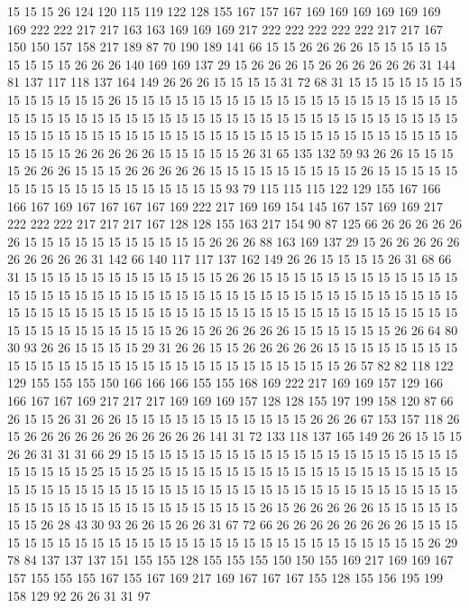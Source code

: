 15 15 15 26 124 120 115 119 122 128 155 167 157 167 169 169 169 169 169 169
169 222 222 217 217 163 163 169 169 169 217 222 222 222 222 222 217 217 167 150
150 157 158 217 189 87 70 190 189 141 66 15 15 26 26 26 26 15 15 15
15 15 15 15 15 15 26 26 26 140 169 169 137 29 15 26 26 26 15 26
26 26 26 26 26 31 144 81 137 117 118 137 164 149 26 26 26 15 15 15
15 31 72 68 31 15 15 15 15 15 15 15 15 15 15 15 15 15 26 15
15 15 15 15 15 15 15 15 15 15 15 15 15 15 15 15 15 15 15 15
15 15 15 15 15 15 15 15 15 15 15 15 15 15 15 15 15 15 15 15
15 15 15 15 15 15 15 15 15 15 15 15 15 15 15 15 15 15 15 15
15 15 15 15 15 15 15 15 15 15 15 15 15 15 15 15 15 26 26 26
26 26 15 15 15 15 15 26 31 65 135 132 59 93 26 26 15 15 15 15
26 26 26 15 15 15 26 26 26 26 26 15 15 15 15 15 15 15 15 15
26 15 15 15 15 15 15 15 15 15 15 15 15 15 15 15 15 15 15 93
79 115 115 115 122 129 155 167 166 166 167 169 167 167 167 167 169 222 217 169
169 154 145 167 157 169 169 217 222 222 222 217 217 217 167 128 128 155 163 217
154 90 87 125 66 26 26 26 26 26 26 15 15 15 15 15 15 15 15 15
15 15 26 26 26 88 163 169 137 29 15 26 26 26 26 26 26 26 26 26
26 31 142 66 140 117 117 137 162 149 26 26 15 15 15 15 26 31 68 66
31 15 15 15 15 15 15 15 15 15 15 15 15 26 26 15 15 15 15 15
15 15 15 15 15 15 15 15 15 15 15 15 15 15 15 15 15 15 15 15
15 15 15 15 15 15 15 15 15 15 15 15 15 15 15 15 15 15 15 15
15 15 15 15 15 15 15 15 15 15 15 15 15 15 15 15 15 15 15 15
15 15 15 15 15 15 15 15 15 15 15 26 15 26 26 26 26 26 15 15
15 15 15 15 26 26 64 80 30 93 26 26 15 15 15 15 29 31 26 26
15 15 26 26 26 26 26 15 15 15 15 15 15 15 15 15 15 15 15 15
15 15 15 15 15 15 15 15 15 15 15 15 15 15 15 26 57 82 82 118
122 129 155 155 155 150 166 166 166 155 155 168 169 222 217 169 169 157 129 166
166 167 167 169 217 217 217 169 169 169 157 128 128 155 197 199 158 120 87 66
26 15 15 26 31 26 26 15 15 15 15 15 15 15 15 15 15 15 26 26
26 67 153 157 118 26 15 26 26 26 26 26 26 26 26 26 26 26 141 31
72 133 118 137 165 149 26 26 15 15 15 26 26 31 31 31 66 29 15 15
15 15 15 15 15 15 15 15 15 15 15 15 15 15 15 15 15 15 15 15
15 15 15 25 15 15 25 15 15 15 15 15 15 15 15 15 15 15 15 15
15 15 15 15 15 15 15 15 15 15 15 15 15 15 15 15 15 15 15 15
15 15 15 15 15 15 15 15 15 15 15 15 15 15 15 15 15 15 15 15
15 15 15 15 15 15 15 26 15 26 26 26 26 26 15 15 15 15 15 15
15 26 28 43 30 93 26 26 15 26 26 31 67 72 66 26 26 26 26 26
26 26 26 15 15 15 15 15 15 15 15 15 15 15 15 15 15 15 15 15
15 15 15 15 15 15 15 15 15 15 15 26 29 78 84 137 137 137 151 155
155 128 155 155 155 150 150 155 169 217 169 169 167 157 155 155 155 167 155 167
169 217 169 167 167 167 155 128 155 156 195 199 158 129 92 26 26 31 31 97
